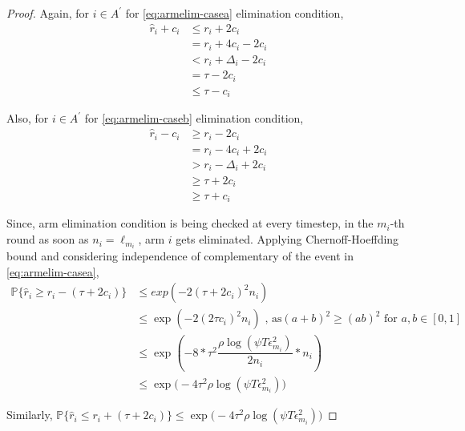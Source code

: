 \begin{proof}
Again, for ${i} \in A^{'}$ for \ref{eq:armelim-casea} elimination condition, 
\begin{align*}
\hat{r}_{i} + c_{i}&\leq r_{i} + 2c_{i} \\
&= r_{i} + 4c_{i} - 2c_{i} \\
&< r_{i} + \Delta_{i} - 2c_{i}\\
&= \tau -2c_{i} \\
&\leq \tau - c_{i}
\end{align*}

Also, for ${i} \in A^{'}$ for \ref{eq:armelim-caseb} elimination condition, 
\begin{align*}
\hat{r}_{i} - c_{i}&\geq r_{i} - 2c_{i} \\
&= r_{i} - 4c_{i} + 2c_{i} \\
&> r_{i} - \Delta_{i} + 2c_{i}\\
&\geq \tau + 2c_{i} \\
&\geq \tau + c_{i}
\end{align*}

Since, arm elimination condition is being checked at every timestep, in the $m_{i}$-th round as soon as $n_{i}=\ell_{m_{i}}$, arm $i$ gets eliminated. Applying Chernoff-Hoeffding bound and considering independence of complementary of the event in \ref{eq:armelim-casea},
  \begin{align*}
\mathbb{P}\lbrace\hat{r}_{i}\geq r_{i} - (\tau + 2c_{i})\rbrace &\leq exp(-2(\tau + 2c_{i})^{2}n_{i})\\
&\leq \exp(-2(2\tau c_{i})^{2}n_{i}) \text{ , as} (a+b)^{2} \geq (ab)^{2} \text{ for } a,b\in[0,1]\\
&\leq \exp(-8 * \tau^{2}\dfrac{\rho\log (\psi T\epsilon_{m_{i}}^{2})}{2 n_{i}} *n_{i})\\
&\leq \exp\big(-4\tau^{2}\rho\log (\psi T\epsilon_{m_{i}}^{2})\big)
  \end{align*}
  

Similarly, $\mathbb{P}\lbrace\hat{r}_{i}\leq r_{i} + (\tau + 2c_{i})\rbrace\leq \exp\big(-4\tau^{2}\rho\log (\psi T\epsilon_{m_{i}}^{2})\big)$
 


\end{proof}
